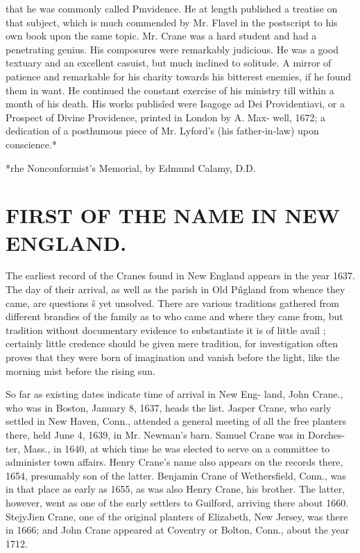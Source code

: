 that he was commonly called Pmvidence. He at length published 
a treatise on that subject, which is much commended by Mr. 
Flavel in the postscript to his own book upon the same topic. 
Mr. Crane was a hard student and had a penetrating genius. 
His composures were remarkably judicious. He was a good 
textuary and an excellent casuist, but much inclined to solitude. 
A mirror of patience and remarkable for his charity towards his 
bitterest enemies, if he found them in want. He continued the 
constant exercise of his ministry till within a month of his death. 
His works publis\^ied were Isagoge ad Dei Providentiavi, or a 
Prospect of Divine Providence, printed in London by A. Max- 
well, 1672; a dedication of a posthumous piece of Mr. Lyford's 
(his father-in-law) upon conscience.* 

*rhe Nonconformist's Memorial, by Edmund Calamy, D.D. 



\chapter{FIRST OF THE NAME IN NEW ENGLAND.}


The earliest record of the Cranes found in New England appears 
in the year 1637. The day of their arrival, as well as the parish 
in Old P\^ngland from whence they came, are questions \^s yet 
unsolved. There are various traditions gathered from different 
brandies of the family as to who came and where they came 
from, but tradition without documentary evidence to substantiate 
it is of little avail ; certainly little credence should be given mere 
tradition, for investigation often proves that they were born of 
imagination and vanish before the light, like the morning mist 
before the rising sun. 

So far as existing dates indicate time of arrival in New Eng- 
land, John Crane., who was in Boston, January 8, 1637, heads the 
list. Jasper Crane, who early settled in New Haven, Conn., 
attended a general meeting of all the free planters there, held June 
4, 1639, in Mr. Newman's barn. Samuel Crane was in Dorches- 
ter, Mass., in 1640, at which time he was elected to serve on a 
committee to administer town affairs. Henry Crane's name also 
appears on the records there, 1654, presumably son of the latter. 
Benjamin Crane of Wethersfield, Conn., was in that place as 
early as 1655, as was also Henry Crane, his brother. The latter, 
however, went as one of the early settlers to Guilford, arriving 
there about 1660. StejyJien Crane, one of the original planters 
of Elizabeth, New Jersey, was there in 1666; and John Crane 
appeared at Coventry or Bolton, Conn., about the year 1712. 

